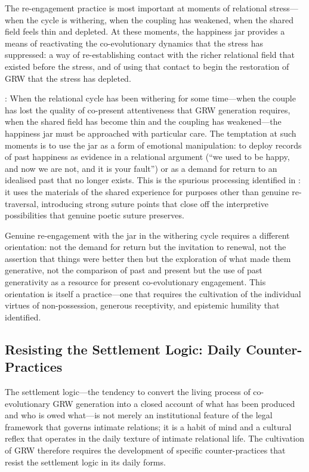 The re-engagement practice is most important at moments of relational stress---when the cycle is withering, when the coupling has weakened, when the shared field feels thin and depleted. At these moments, the happiness jar provides a means of reactivating the co-evolutionary dynamics that the stress has suppressed: a way of re-establishing contact with the richer relational field that existed before the stress, and of using that contact to begin the restoration of GRW that the stress has depleted.

: When the relational cycle has been withering for some time---when the couple has lost the quality of co-present attentiveness that GRW generation requires, when the shared field has become thin and the coupling has weakened---the happiness jar must be approached with particular care. The temptation at such moments is to use the jar as a form of emotional manipulation: to deploy records of past happiness as evidence in a relational argument (``we used to be happy, and now we are not, and it is your fault'') or as a demand for return to an idealised past that no longer exists. This is the spurious processing identified in : it uses the materials of the shared experience for purposes other than genuine re-traversal, introducing strong suture points that close off the interpretive possibilities that genuine poetic suture preserves.

Genuine re-engagement with the jar in the withering cycle requires a different orientation: not the demand for return but the invitation to renewal, not the assertion that things were better then but the exploration of what made them generative, not the comparison of past and present but the use of past generativity as a resource for present co-evolutionary engagement. This orientation is itself a practice---one that requires the cultivation of the individual virtues of non-possession, generous receptivity, and epistemic humility that  identified.

\subsection{Resisting the Settlement Logic: Daily Counter-Practices}
\label{p15:subsec:resisting_settlement}

\noindent
The settlement logic---the tendency to convert the living process of co-evolutionary GRW generation into a closed account of what has been produced and who is owed what---is not merely an institutional feature of the legal framework that governs intimate relations; it is a habit of mind and a cultural reflex that operates in the daily texture of intimate relational life. The cultivation of GRW therefore requires the development of specific counter-practices that resist the settlement logic in its daily forms.

